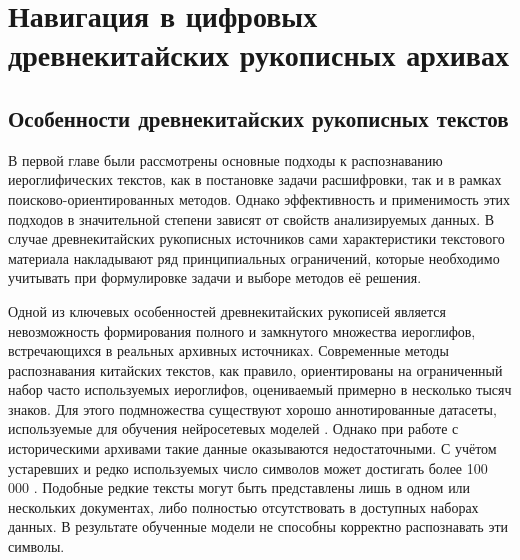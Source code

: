 \chapter{Навигация в цифровых древнекитайских рукописных архивах}\label{ch:ch2}
\section{Особенности древнекитайских рукописных текстов}\label{sec:ch2/sec1}
В первой главе были рассмотрены основные подходы к распознаванию иероглифических текстов, как в постановке задачи расшифровки, так и в рамках поисково-ориентированных методов. Однако эффективность и применимость этих подходов в значительной степени зависят от свойств анализируемых данных. В случае древнекитайских рукописных источников сами характеристики текстового материала накладывают ряд принципиальных ограничений, которые необходимо учитывать при формулировке задачи и выборе методов её решения.

Одной из ключевых особенностей древнекитайских рукописей является невозможность формирования полного и замкнутого множества иероглифов, встречающихся в реальных архивных источниках. Современные методы распознавания китайских текстов, как правило, ориентированы на ограниченный набор часто используемых иероглифов, оцениваемый примерно в несколько тысяч знаков. Для этого подмножества существуют хорошо аннотированные датасеты, используемые для обучения нейросетевых моделей \cite{li2022large, sun2019chinese}. Однако при работе с историческими архивами такие данные оказываются недостаточными. С учётом устаревших и редко используемых число символов может достигать более 100 000 \cite{li2016criteria}. Подобные редкие тексты могут быть представлены лишь в одном или нескольких документах, либо полностью отсутствовать в доступных наборах данных. В результате обученные модели не способны корректно распознавать эти символы.

